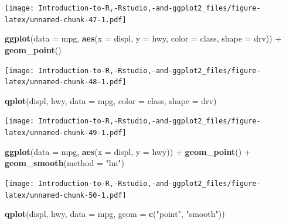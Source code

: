 \documentclass[]{book}
\newenvironment{Shaded}{\begin{snugshade}}{\end{snugshade}}
\newcommand{\KeywordTok}[1]{\textcolor[rgb]{0.13,0.29,0.53}{\textbf{{#1}}}}
\newcommand{\DataTypeTok}[1]{\textcolor[rgb]{0.13,0.29,0.53}{{#1}}}
\newcommand{\StringTok}[1]{\textcolor[rgb]{0.31,0.60,0.02}{{#1}}}
\newcommand{\NormalTok}[1]{{#1}}
\begin{document}
\texttt{[image: Introduction-to-R,-Rstudio,-and-ggplot2\_files/figure-latex/unnamed-chunk-47-1.pdf]}

\begin{Shaded}
\begin{Highlighting}[]
\KeywordTok{ggplot}\NormalTok{(}\DataTypeTok{data =} \NormalTok{mpg, }\KeywordTok{aes}\NormalTok{(}\DataTypeTok{x =} \NormalTok{displ, }\DataTypeTok{y =} \NormalTok{hwy, }\DataTypeTok{color =} \NormalTok{class, }\DataTypeTok{shape =} \NormalTok{drv)) +}\StringTok{ }\KeywordTok{geom_point}\NormalTok{()}
\end{Highlighting}
\end{Shaded}

\texttt{[image: Introduction-to-R,-Rstudio,-and-ggplot2\_files/figure-latex/unnamed-chunk-48-1.pdf]}

\begin{Shaded}
\begin{Highlighting}[]
\KeywordTok{qplot}\NormalTok{(displ, hwy, }\DataTypeTok{data =} \NormalTok{mpg, }\DataTypeTok{color =} \NormalTok{class, }\DataTypeTok{shape =} \NormalTok{drv)}
\end{Highlighting}
\end{Shaded}

\texttt{[image: Introduction-to-R,-Rstudio,-and-ggplot2\_files/figure-latex/unnamed-chunk-49-1.pdf]}

\begin{Shaded}
\begin{Highlighting}[]
\KeywordTok{ggplot}\NormalTok{(}\DataTypeTok{data =} \NormalTok{mpg, }\KeywordTok{aes}\NormalTok{(}\DataTypeTok{x =} \NormalTok{displ, }\DataTypeTok{y =} \NormalTok{hwy)) +}\StringTok{ }\KeywordTok{geom_point}\NormalTok{() +}\StringTok{ }\KeywordTok{geom_smooth}\NormalTok{(}\DataTypeTok{method =} \StringTok{"lm"}\NormalTok{)}
\end{Highlighting}
\end{Shaded}

\texttt{[image: Introduction-to-R,-Rstudio,-and-ggplot2\_files/figure-latex/unnamed-chunk-50-1.pdf]}

\begin{Shaded}
\begin{Highlighting}[]
\KeywordTok{qplot}\NormalTok{(displ, hwy, }\DataTypeTok{data =} \NormalTok{mpg, }\DataTypeTok{geom =} \KeywordTok{c}\NormalTok{(}\StringTok{"point"}\NormalTok{, }\StringTok{"smooth"}\NormalTok{)) }
\end{Highlighting}
\end{Shaded}
\end{document}
